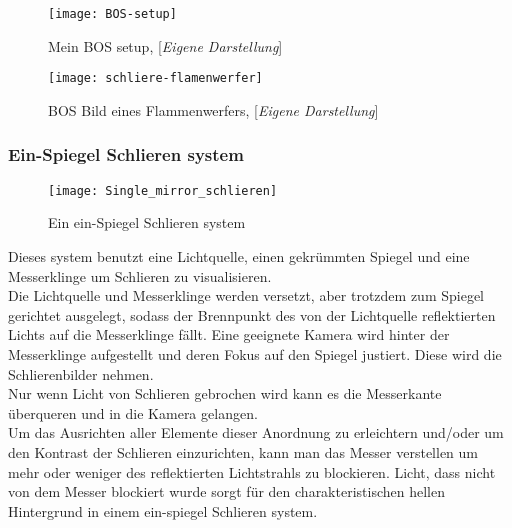 \begin{figure}[h]
    \centering
    \begin{minipage}{0.5\textwidth}
        \centering
        \texttt{[image: BOS-setup]}
        \caption{Mein BOS setup, [\textit{Eigene Darstellung}]}
        \label{fig:sl_bos1}
    \end{minipage}
    \hfill
    \begin{minipage}{0.4\textwidth}
        \centering
        \texttt{[image: schliere-flamenwerfer]}
        \caption{BOS Bild eines Flammenwerfers, [\textit{Eigene Darstellung}]}
        \label{fig:sl_bos2}
    \end{minipage}
\end{figure}

\newpage

\subsubsection{Ein-Spiegel Schlieren system}\label{subsubsec:ein-spiegel-schlieren-system}

\begin{figure}[h]
    \centering
    \texttt{[image: Single\_mirror\_schlieren]}
    \caption{Ein ein-Spiegel Schlieren system \cite[\textit{in Anlehnung an}][]{esss}}
    \label{fig:esss}
\end{figure}
\noindent
Dieses system benutzt eine Lichtquelle, einen gekrümmten Spiegel und eine Messerklinge um Schlieren zu visualisieren.
\smallskip\\
Die Lichtquelle und Messerklinge werden versetzt, aber trotzdem zum Spiegel gerichtet ausgelegt,
sodass der Brennpunkt des von der Lichtquelle reflektierten Lichts auf die Messerklinge fällt.
Eine geeignete Kamera wird hinter der Messerklinge aufgestellt und deren Fokus auf den Spiegel justiert.
Diese wird die Schlierenbilder nehmen.\\
Nur wenn Licht von Schlieren gebrochen wird kann es die Messerkante überqueren und in die Kamera gelangen.
\smallskip\\
Um das Ausrichten aller Elemente dieser Anordnung zu erleichtern und/oder um den Kontrast der Schlieren einzurichten,
kann man das Messer verstellen um mehr oder weniger des reflektierten Lichtstrahls zu blockieren.
Licht, dass nicht von dem Messer blockiert wurde sorgt für den charakteristischen hellen Hintergrund in einem ein-spiegel Schlieren system.




